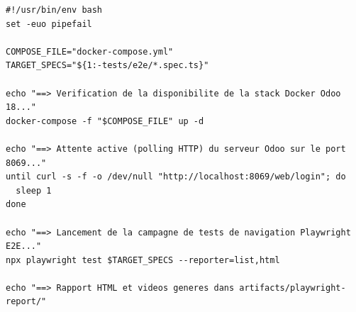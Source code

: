 \begin{lstlisting}[caption={Extrait du script d'exécution \texttt{scripts/e2e-run.sh}}]
#!/usr/bin/env bash
set -euo pipefail

COMPOSE_FILE="docker-compose.yml"
TARGET_SPECS="${1:-tests/e2e/*.spec.ts}"

echo "==> Verification de la disponibilite de la stack Docker Odoo 18..."
docker-compose -f "$COMPOSE_FILE" up -d

echo "==> Attente active (polling HTTP) du serveur Odoo sur le port 8069..."
until curl -s -f -o /dev/null "http://localhost:8069/web/login"; do
  sleep 1
done

echo "==> Lancement de la campagne de tests de navigation Playwright E2E..."
npx playwright test $TARGET_SPECS --reporter=list,html

echo "==> Rapport HTML et videos generes dans artifacts/playwright-report/"
\end{lstlisting}